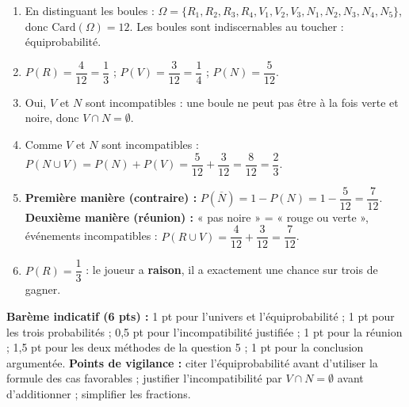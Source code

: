 \documentclass[11pt]{article}
\begin{document}
\begin{corrige}
\begin{enumerate}
\item En distinguant les boules : $\Omega = \{R_1, R_2, R_3, R_4, V_1, V_2, V_3, N_1, N_2, N_3, N_4, N_5\}$, donc $\text{Card}(\Omega) = 12$. Les boules sont indiscernables au toucher : équiprobabilité.
\item $P(R) = \dfrac{4}{12} = \dfrac{1}{3}$ ; \quad $P(V) = \dfrac{3}{12} = \dfrac{1}{4}$ ; \quad $P(N) = \dfrac{5}{12}$.
\item Oui, $V$ et $N$ sont incompatibles : une boule ne peut pas être à la fois verte et noire, donc $V \cap N = \emptyset$.
\item Comme $V$ et $N$ sont incompatibles : $P(N \cup V) = P(N) + P(V) = \dfrac{5}{12} + \dfrac{3}{12} = \dfrac{8}{12} = \dfrac{2}{3}$.
\item \textbf{Première manière (contraire) :} $P(\overline{N}) = 1 - P(N) = 1 - \dfrac{5}{12} = \dfrac{7}{12}$.
\textbf{Deuxième manière (réunion) :} « pas noire » = « rouge ou verte », événements incompatibles : $P(R \cup V) = \dfrac{4}{12} + \dfrac{3}{12} = \dfrac{7}{12}$.
\item $P(R) = \dfrac{1}{3}$ : le joueur a \textbf{raison}, il a exactement une chance sur trois de gagner.
\end{enumerate}
\textbf{Barème indicatif (6 pts) :} 1 pt pour l'univers et l'équiprobabilité ; 1 pt pour les trois probabilités ; 0,5 pt pour l'incompatibilité justifiée ; 1 pt pour la réunion ; 1,5 pt pour les deux méthodes de la question 5 ; 1 pt pour la conclusion argumentée.
\textbf{Points de vigilance :} citer l'équiprobabilité avant d'utiliser la formule des cas favorables ; justifier l'incompatibilité par $V \cap N = \emptyset$ avant d'additionner ; simplifier les fractions.
\end{corrige}
\end{document}
